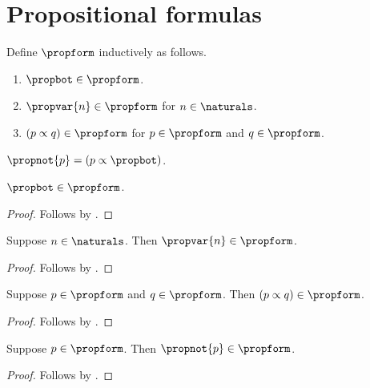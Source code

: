 


\section{Propositional formulas}


\begin{datatype}\label{propform}
    Define $\propform$ inductively as follows.
    \begin{enumerate}
        \item $\propbot \in \propform$.
        \item $\propvar{n} \in \propform$ for $n \in \naturals$.
        \item $(p \propto q) \in \propform$ for $p \in \propform$ and $q \in \propform$.
    \end{enumerate}
\end{datatype}

\begin{abbreviation}\label{propnot}
    $\propnot{p} = (p \propto \propbot)$.
\end{abbreviation}

\begin{proposition}\label{propform_bot_intro}
    $\propbot \in \propform$.
\end{proposition}
\begin{proof}
    Follows by .
\end{proof}

\begin{proposition}\label{propform_var_intro}
    Suppose $n \in \naturals$.
    Then $\propvar{n} \in \propform$.
\end{proposition}
\begin{proof}
    Follows by .
\end{proof}

\begin{proposition}\label{propform_imp_intro}
    Suppose $p \in \propform$ and $q \in \propform$.
    Then $(p \propto q) \in \propform$.
\end{proposition}
\begin{proof}
    Follows by .
\end{proof}

\begin{proposition}\label{propnot_intro}
    Suppose $p \in \propform$.
    Then $\propnot{p} \in \propform$.
\end{proposition}
\begin{proof}
    Follows by .
\end{proof}

